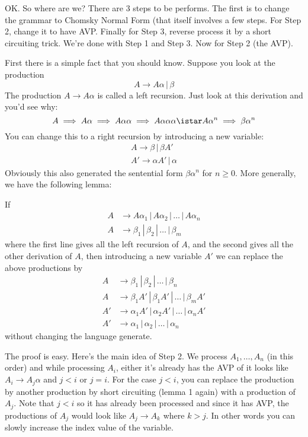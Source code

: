 OK. So where are we? There are 3 steps to be performs. The first
is to change the grammar to Chomsky Normal Form (that itself
involves a few steps. For Step 2, change it to have AVP. Finally
for Step 3, reverse process it by a short circuiting trick. We're
done with Step 1 and Step 3. Now for Step 2 (the AVP).

First there is a simple fact that you should know. Suppose you
look at the production
\[
 A \rightarrow A \alpha \,|\, \beta
\]
The production $A \rightarrow A \alpha$ is called a left
recursion. Just look at this derivation and you'd see why:
\[
 A \implies A \alpha \implies A\alpha\alpha \implies A
 \alpha\alpha\alpha \istar A \alpha^n \implies \beta \alpha^n
\]
You can change this to a right recursion by introducing a new
variable:
\begin{align*}
 A \rightarrow \beta \,|\, \beta A' \\
 A' \rightarrow \alpha A' \,|\, \alpha
\end{align*}
Obviously this also generated the sentential form $\beta\alpha^n$
for $n \geq 0$. More generally, we have the following lemma:

\begin{lem}
If
\begin{align*}
 A &\rightarrow A \alpha_1 \,|\, A \alpha_2 \,|\, \ldots \,|\, A
 \alpha_n \\
 A &\rightarrow \beta_1 \,|\, \beta_2 \,|\, \ldots \,|\, \beta_m
\end{align*}
where the first line gives all the left recursion of $A$, and the
second gives all the other derivation of $A$, then introducing a
new variable $A'$ we can replace the above productions by
\begin{align*}
 A &\rightarrow \beta_1 \,|\, \beta_2 \,|\, \ldots \,|\, \beta_n \\
 A &\rightarrow \beta_1 A' \,|\, \beta_1 A' \,|\, \ldots \,|\, \beta_mA' \\
 A' &\rightarrow \alpha_1 A' \,|\, \alpha_2 A' \,|\, \ldots \,|\, \alpha_n A' \\
 A' &\rightarrow \alpha_1 \,|\, \alpha_2 \,|\, \ldots \,|\, \alpha_n
\end{align*}
without changing the language generate.
\end{lem}

The proof is easy. Here's the main idea of Step 2. We process
$A_1, \ldots, A_n$ (in this order) and while processing $A_i$,
either it's already has the AVP of it looks like $A_i \rightarrow
A_j \alpha$ and $j<i$ or $j=i$. For the case $j<i$, you can
replace the production by another production by short circuiting
(lemma 1 again) with a production of $A_j$. Note that $j<i$ so it
has already been processed and since it has AVP, the productions
of $A_j$ would look like $A_j \rightarrow A_k$ where $k>j$. In
other words you can slowly increase the index value of the
variable.

